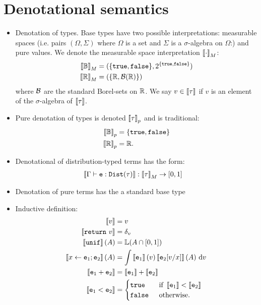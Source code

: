 \documentclass{tufte-handout}
\begin{document}
\section{Denotational semantics}
\begin{itemize}
  \item Denotation of types. Base types have two possible interpretations: measurable spaces (i.e. pairs $(\Omega, \Sigma)$ where $\Omega$ is a set and $\Sigma$ is a $\sigma$-algebra on 
  $\Omega$:) and pure 
  values. We denote the measurable space interpretation $\left \llbracket {\cdot} \right \rrbracket_M$:
  \begin{align*}
    \left \llbracket {\mathbb{B}} \right \rrbracket_M &= (\{\texttt{true}, \texttt{false}\}, 2^{\{\texttt{true}, \texttt{false}\}}) \\
    \left \llbracket {\mathbb{R}} \right \rrbracket_M &= (\{\mathbb{R}, \mathcal{B}(\mathbb{R})\})
  \end{align*}
  where $\mathcal{B}$ are the standard Borel-sets on $\mathbb{R}$. We say $v \in \left \llbracket {\tau} \right \rrbracket$ 
  if $v$ is an element of the $\sigma$-algebra of $\left \llbracket {\tau} \right \rrbracket$.

  \item Pure denotation of types is denoted $\left \llbracket {\tau} \right \rrbracket_p$ and is traditional:
  \begin{align*}
    \left \llbracket {\mathbb{B}} \right \rrbracket_p &= \{\texttt{true}, \texttt{false}\} \\
    \left \llbracket {\mathbb{R}} \right \rrbracket_p &= \mathbb{R}.
  \end{align*}

\item Denotational of distribution-typed terms has the form:
\begin{align}
  \left \llbracket {\Gamma \vdash \texttt{e}: \mathtt{Dist}(\tau)} \right \rrbracket &: \left \llbracket {\tau} \right \rrbracket_M \rightarrow [0, 1]
\end{align}

\item Denotation of pure terms has the a standard base type

\item Inductive definition:
\begin{align*}
  \left \llbracket {v} \right \rrbracket &= v \\
  \left \llbracket {\texttt{return}~v} \right \rrbracket &= \delta_v\\
  \left \llbracket {\texttt{unif}} \right \rrbracket(A) &= \mathbb{L}(A \cap [0, 1]) \\
  \left \llbracket {x \leftarrow \texttt{e}_1; \texttt{e}_2} \right \rrbracket(A) &= 
  \int \left \llbracket {\texttt{e}_1} \right \rrbracket(v) \left \llbracket {\texttt{e}_2[v/x]} \right \rrbracket(A)~\mathrm{d}v \\
  \left \llbracket {\texttt{e}_1 + \texttt{e}_2} \right \rrbracket &= \left \llbracket {\texttt{e}_1} \right \rrbracket + \left \llbracket {\texttt{e}_2} \right \rrbracket \\
  \left \llbracket {\texttt{e}_1 < \texttt{e}_2} \right \rrbracket &= \begin{cases}
    \texttt{true} \quad& \text{if } \left \llbracket {\texttt{e}_1} \right \rrbracket < \left \llbracket {\texttt{e}_2} \right \rrbracket \\ 
    \texttt{false} & \text{otherwise.}
  \end{cases}
\end{align*}

\end{itemize}
\end{document}

